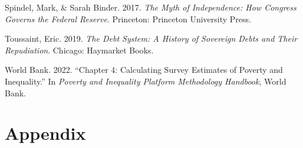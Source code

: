 \documentclass[
  11pt,
]{article}
\newlength{\cslhangindent}
\newlength{\cslentryspacingunit} %
\newenvironment{CSLReferences}[2] %
 {%
  \setlength{\parindent}{0pt}
  \ifodd #1
  \let\oldpar\par
  \def\par{\hangindent=\cslhangindent\oldpar}
  \fi
  \setlength{\parskip}{#2\cslentryspacingunit}
 }%
 {}
\begin{document}
\begin{CSLReferences}{1}{0}
\leavevmode{}%
Spindel, Mark, \& Sarah Binder. 2017. \emph{The {Myth} of
{Independence}: {How Congress Governs} the {Federal Reserve}}.
{Princeton}: {Princeton University Press}.

\leavevmode{}%
Toussaint, Eric. 2019. \emph{The Debt System: A History of Sovereign
Debts and Their Repudiation}. {Chicago}: {Haymarket Books}.

\leavevmode{}%
World Bank. 2022. {``Chapter 4: {Calculating} Survey Estimates of
Poverty and Inequality.''} In \emph{Poverty and {Inequality Platform
Methodology Handbook}}, {World Bank}.

\end{CSLReferences}

\singlespace
\newpage
{}

\pagestyle{APP}

\hypertarget{appendix}{%
\section*{Appendix}\label{appendix}}
\end{document}
